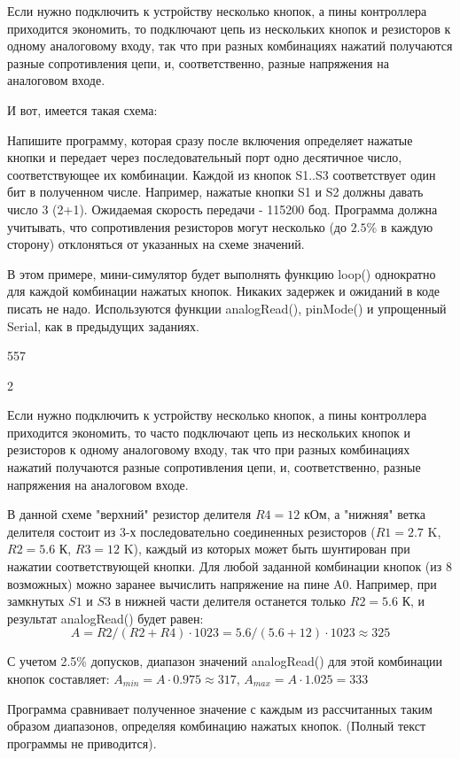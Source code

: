 
Если нужно подключить к устройству несколько кнопок, а пины контроллера приходится экономить, то подключают цепь из нескольких кнопок и резисторов к одному аналоговому входу, так что при разных комбинациях нажатий получаются разные сопротивления цепи, и, соответственно, разные напряжения на  аналоговом входе.  

И вот, имеется такая схема:


Напишите программу, которая сразу после включения определяет нажатые кнопки и передает через последовательный порт одно десятичное число, 
соответствующее их комбинации.  Каждой из кнопок S1..S3 соответствует один бит в полученном числе.  Например, нажатые кнопки S1 и S2 должны 
давать число 3  (2+1).     Ожидаемая скорость передачи - 115200 бод.  Программа должна учитывать,  что сопротивления резисторов могут 
несколько (до $2.5\%$ в каждую сторону) отклоняться от  указанных на схеме значений.

В этом примере, мини-симулятор будет выполнять функцию loop() однократно для каждой комбинации нажатых кнопок.  Никаких  задержек 
и ожиданий в коде писать не надо.  Используются функции analogRead(), pinMode() и упрощенный Serial, как в предыдущих заданиях.

\begin{myverbbox}[\small]{\vinput}
    557
\end{myverbbox}
\begin{myverbbox}[\small]{\voutput}
    2
\end{myverbbox}

\solutionSection

Если нужно подключить к устройству несколько кнопок, а пины контроллера приходится экономить, то часто подключают цепь из нескольких кнопок и резисторов к одному аналоговому входу, так что при разных комбинациях нажатий получаются разные сопротивления цепи, и, соответственно, разные напряжения на  аналоговом входе.

В данной схеме "верхний" резистор делителя $R4=12$ кОм, а "нижняя" ветка делителя состоит из 3-х последовательно соединенных резисторов ($R1=2.7$ K, $R2=5.6$ К, $R3=12$ K), каждый из которых может быть шунтирован при нажатии соответствующей кнопки.  Для любой заданной комбинации кнопок (из 8 возможных) можно заранее вычислить напряжение на пине A0. Например, при замкнутых $S1$ и $S3$ в нижней части делителя останется только $R2=5.6$ К, и результат analogRead() будет равен:
$$A= R2 / (R2 + R4) \cdot 1023 = 5.6 / (5.6 + 12 ) \cdot 1023 \approx 325$$

С учетом 2.5\% допусков, диапазон значений analogRead() для этой комбинации кнопок составляет:  $A_{min} = A \cdot 0.975 \approx 317$,  $A_{max} = A \cdot 1.025 = 333$

Программа сравнивает полученное значение с каждым из рассчитанных таким образом диапазонов, определяя комбинацию нажатых кнопок.  (Полный текст программы не приводится).